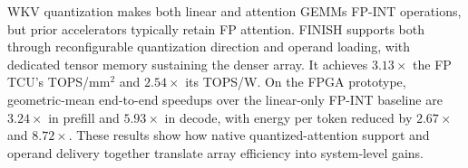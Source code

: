 \documentclass[sigconf,anonymous,nonacm]{acmart}
\newcommand{\ours}{\textsc{FINISH}}
\newcommand{\fpint}{FP-INT}
\begin{document}
WKV quantization makes both linear and attention GEMMs \fpint{} operations, but prior accelerators typically retain FP attention. \ours{} supports both through reconfigurable quantization direction and operand loading, with dedicated tensor memory sustaining the denser array. It achieves $3.13\times$ the FP TCU's TOPS/mm$^2$ and $2.54\times$ its TOPS/W. On the FPGA prototype, geometric-mean end-to-end speedups over the linear-only \fpint{} baseline are $3.24\times$ in prefill and $5.93\times$ in decode, with energy per token reduced by $2.67\times$ and $8.72\times$. These results show how native quantized-attention support and operand delivery together translate array efficiency into system-level gains.







\end{document}
